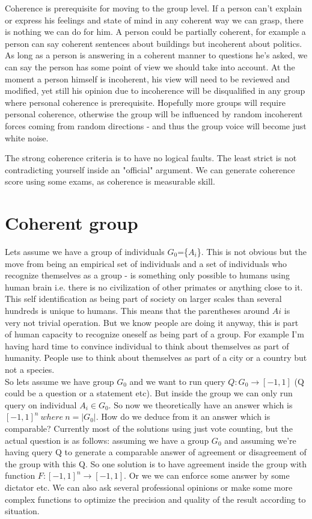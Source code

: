 \documentclass{article}
\begin{document}
Coherence is prerequisite for moving to the group level. If a person can't explain or express his feelings and state of mind in any coherent way we can grasp, there is nothing we can do for him. A person could be partially coherent, for example a person can say coherent sentences about buildings but incoherent about politics. As long as a person is answering in a coherent manner to questions he's asked, we can say the person has some point of view we should take into account. At the moment a person himself is incoherent, his view will need to be reviewed and modified, yet still his opinion due to incoherence will be disqualified in any group where personal coherence is prerequisite. Hopefully more groups will require personal coherence, otherwise the group will be influenced by random incoherent forces coming from random directions - and thus the group voice will become just white noise. 

The strong coherence criteria is to have no logical faults. The least strict is not contradicting yourself inside an "official" argument. We can generate coherence score using some exams, as coherence is measurable skill. 

\section{Coherent group}

Lets assume we have a group of individuals $G_{0}$=\{$A_{i}$\}. This is not obvious but the move from being an empirical set of individuals and a set of individuals who recognize themselves as a group - is something only possible to humans using human brain i.e. there is no civilization of other primates or anything close to it. This self identification as being part of society on larger scales than several hundreds is unique to humans. This means that the parentheses around $Ai$ is very not trivial operation. But we know people are doing it anyway, this is part of human capacity to recognize oneself as being part of a group. For example I'm having hard time to convince individual to think about themselves as part of humanity. People use to think about themselves as part of a city or a country but not a species. \\

So lets assume we have group $G_{0}$ and we want to run query $Q:G_{0} \to [-1,1]$ (Q could be a question or a statement etc). But inside the group we can only run query on individual $A_{i} \in G_{0}$. So now we theoretically have an answer which is $ [-1,1]^n \ where \ n = |G_{0}|$. How do we deduce from it an answer which is comparable? Currently most of the solutions using just vote counting, but the actual question is as follows: assuming we have a group $G_{0}$ and assuming we're having query Q to generate a comparable answer of agreement or disagreement of the group with this Q. So one solution is to have agreement inside the group with function $F:[-1,1]^n \to [-1,1]$. Or we we can enforce some answer by some dictator etc. We can also ask several professional opinions or make some more complex functions to optimize the precision and quality of the result according to situation. \\
\end{document}
